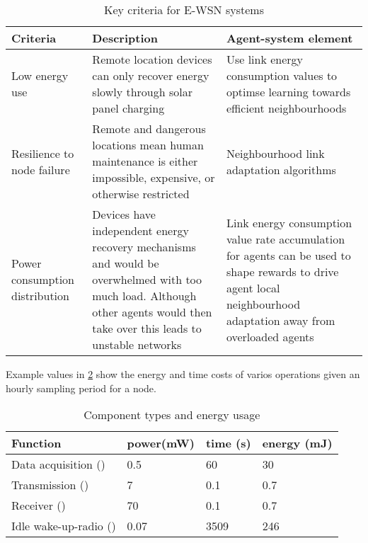 \begin{table}
	\begin{tabular}{p{}p{} p{}}
		\hline
		\textbf{Criteria} & \textbf{Description} & \textbf{Agent-system element} \\
		\hline
		Low energy use & Remote location devices can only recover energy slowly through solar panel charging &  Use link energy consumption values to optimse learning towards efficient neighbourhoods \\
		Resilience to node failure & Remote and dangerous locations mean human maintenance is either impossible, expensive, or otherwise restricted & Neighbourhood link adaptation algorithms \\	
		Power consumption distribution & Devices have independent energy recovery mechanisms and would be overwhelmed with too much load. Although other agents would then take over this leads to unstable networks & Link energy consumption value rate accumulation for agents can be used to shape rewards to drive agent local neighbourhood adaptation away from overloaded agents  \\ 
		\hline
	\end{tabular}
	\caption{Key criteria for E-WSN systems}
	\label{table:real_world_systems_criteria}
\end{table}
Example values in \ref{table:components_energy_usage} show the energy and time costs of varios operations given an hourly sampling period for a node.
\begin{table}[ht]
	\begin{tabular}{p{}p{} p{} p{}}
		\hline
		\textbf{Function} & \textbf{power(mW)} & \textbf{time (s)} & \textbf{energy (mJ)}\\
		\hline
		Data acquisition (\symbolDataAcquisition{}{}) & 0.5 & 60 & 30 \\
		Transmission (\symbolTransmission{}{}) & 7 & 0.1 & 0.7 \\
		Receiver (\symbolReceiver{}{}) & 70 & 0.1 & 0.7 \\
		Idle wake-up-radio (\symbolWakeUpRadio{}{}) & 0.07 & 3509 & 246  \\
		\hline
	\end{tabular}
	\caption{Component types and energy usage}
	\label{table:components_energy_usage}
\end{table}
